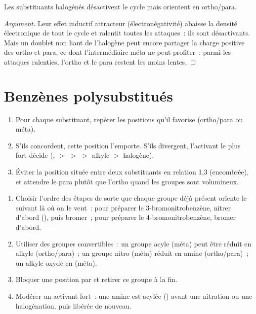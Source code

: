 \begin{proposition}[Halogènes]\label{prop:b2:aromatic-substitution:halogens}
Les substituants halogénés désactivent le cycle mais orientent en ortho/para.
\end{proposition}

\begin{proof}[Argument]
Leur effet inductif attracteur (électronégativité) abaisse la densité électronique de tout le
cycle et ralentit toutes les attaques~: ils sont désactivants. Mais un doublet non liant de
l'halogène peut encore partager la charge positive des  ortho et para,
ce dont l'intermédiaire méta ne peut profiter~: parmi les attaques ralenties, l'ortho et le para
restent les moins lentes.
\end{proof}

\section{Benzènes polysubstitués}

\begin{method}\label{met:b2:aromatic-substitution:predict-position}
\begin{enumerate}
  \item Pour chaque substituant, repérer les positions qu'il favorise (ortho/para ou méta).
  \item S'ils concordent, cette position l'emporte. S'ils divergent, l'activant le plus fort décide
        (,  $>$  $>$  $>$ alkyle $>$ halogène).
  \item Éviter la position située entre deux substituants en relation 1,3 (encombrée), et
        attendre le para plutôt que l'ortho quand les groupes sont volumineux.
\end{enumerate}
\end{method}

\begin{method}\label{met:b2:aromatic-substitution:plan-aromatic}
\begin{enumerate}
  \item Choisir l'ordre des étapes de sorte que chaque groupe déjà présent oriente le suivant
        là où on le veut~: pour préparer le 3-bromonitrobenzène, nitrer d'abord (),
        puis bromer~; pour préparer le 4-bromonitrobenzène, bromer d'abord.
  \item Utiliser des groupes convertibles~: un groupe acyle (méta) peut être réduit en alkyle
        (ortho/para)~; un groupe nitro (méta) réduit en amine (ortho/para)~; un alkyle oxydé en
         (méta).
  \item Bloquer une position par  et retirer ce groupe à la fin.
  \item Modérer un activant fort~: une amine est acylée () avant une nitration ou
        une halogénation, puis libérée de nouveau.
\end{enumerate}
\end{method}

